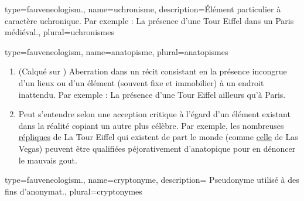 


\makeglossaries

{
  type=fauveneologism.,
    name={uchronisme},
    description={Élément particulier à caractère uchronique. Par exemple : La présence d’une Tour Eiffel dans un Paris médiéval.},
    plural={uchronismes}
}

{
  type=fauveneologism,
    name={anatopisme},
    plural={anatopismes}
}
{
  \begin{enumerate}
    \item (Calqué sur \href{https://fr.wikipedia.org/wiki/Anachronisme}{}) Aberration dans un récit consistant en la présence incongrue d’un lieux ou d’un élément (souvent fixe et immobilier) à un endroit inattendu. Par exemple : La présence d’une Tour Eiffel ailleurs qu’à Paris. 
    \item Peut s’entendre selon une acception critique à l’égard d’un élément existant dans la réalité copiant un autre plus célèbre. Par exemple, les nombreuses \href{https://fr.wikipedia.org/wiki/R\C3\%A9pliques\_et\_imitations\_de\_la\_tour\_Eiffel}{répliques} de La Tour Eiffel qui existent de part le monde (comme \href{https://fr.wikipedia.org/wiki/Paris\_Las\_Vegas\#Reproduction\_de\_lieux\_parisiens}{celle} de Las Vegas) peuvent être qualifiées péjorativement d’anatopique pour en dénoncer le mauvais gout.
  \end{enumerate}
}

{
  type=fauveneologism.,
    name={cryptonyme},
    description={ Pseudonyme utilisé à des fins d’anonymat.},
    plural={cryptonymes}
}

